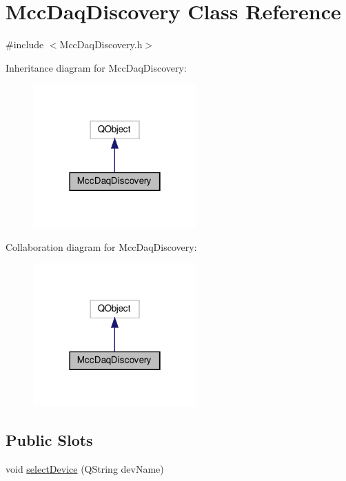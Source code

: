 \hypertarget{class_mcc_daq_discovery}{}\section{Mcc\+Daq\+Discovery Class Reference}
\label{class_mcc_daq_discovery}


{\ttfamily \#include $<$Mcc\+Daq\+Discovery.\+h$>$}



Inheritance diagram for Mcc\+Daq\+Discovery\+:
\nopagebreak
\begin{figure}[H]
\begin{center}
\leavevmode
\includegraphics[width=178pt]{class_mcc_daq_discovery__inherit__graph}
\end{center}
\end{figure}


Collaboration diagram for Mcc\+Daq\+Discovery\+:
\nopagebreak
\begin{figure}[H]
\begin{center}
\leavevmode
\includegraphics[width=178pt]{class_mcc_daq_discovery__coll__graph}
\end{center}
\end{figure}
\subsection*{Public Slots}
\begin{DoxyCompactItemize}
\item 
void \hyperlink{class_mcc_daq_discovery_a658426719d9987f48626708d42397a9e}{select\+Device} (Q\+String dev\+Name)
\end{DoxyCompactItemize}
